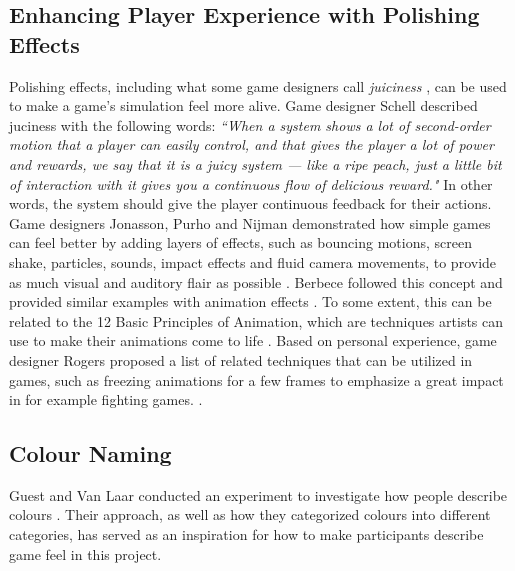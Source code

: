 \subsection{Enhancing Player Experience with Polishing Effects} \label{polishSection}
Polishing effects, including what some game designers call \textit{juiciness} \cite{juice3}, can be used to make a game's simulation feel more alive. Game designer Schell described juciness with the following words: \textit{``When a system shows a lot of second-order motion that a player can easily control, and that gives the player a lot of power and rewards, we say that it is a juicy system --- like a ripe peach, just a little bit of interaction with it gives you a continuous flow of delicious reward."} \cite{schell_art_2008} In other words, the system should give the player continuous feedback for their actions. Game designers Jonasson, Purho and Nijman demonstrated how simple games can feel better by adding layers of effects, such as bouncing motions, screen shake, particles, sounds, impact effects and fluid camera movements, to provide as much visual and auditory flair as possible \cite{juice1, juice2}. Berbece followed this concept and provided similar examples with animation effects \cite{animationSucks}. To some extent, this can be related to the 12 Basic Principles of Animation, which are techniques artists can use to make their animations come to life \cite{animation}. Based on personal experience, game designer Rogers proposed a list of related techniques that can be utilized in games, such as freezing animations for a few frames to emphasize a great impact in for example fighting games. \cite{sticky}.\newpage
\subsection{Colour Naming} \label{colour}
Guest and Van Laar conducted an experiment to investigate how people describe colours \cite{guest_structure_2000}. Their approach, as well as how they categorized colours into different categories, has served as an inspiration for how to make participants describe game feel in this project.

